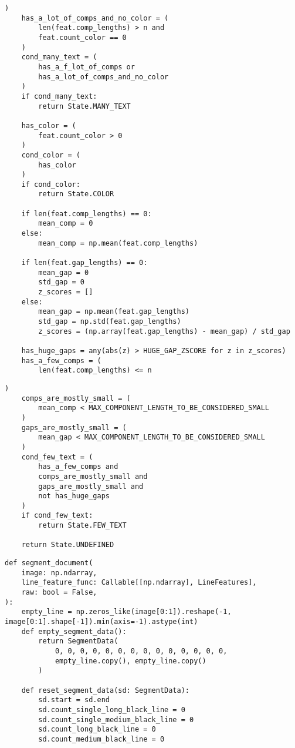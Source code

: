 \begin{lstlisting}[caption={Функция классификации строки (часть 2)}, label={lst:}]
    )
    has_a_lot_of_comps_and_no_color = (
        len(feat.comp_lengths) > n and
        feat.count_color == 0
    )
    cond_many_text = (
        has_a_f_lot_of_comps or
        has_a_lot_of_comps_and_no_color
    )
    if cond_many_text:
        return State.MANY_TEXT

    has_color = (
        feat.count_color > 0
    )
    cond_color = (
        has_color
    )
    if cond_color:
        return State.COLOR

    if len(feat.comp_lengths) == 0:
        mean_comp = 0
    else:
        mean_comp = np.mean(feat.comp_lengths)

    if len(feat.gap_lengths) == 0:
        mean_gap = 0
        std_gap = 0
        z_scores = []
    else:
        mean_gap = np.mean(feat.gap_lengths)
        std_gap = np.std(feat.gap_lengths)
        z_scores = (np.array(feat.gap_lengths) - mean_gap) / std_gap

    has_huge_gaps = any(abs(z) > HUGE_GAP_ZSCORE for z in z_scores)
    has_a_few_comps = (
        len(feat.comp_lengths) <= n
\end{lstlisting}

\begin{lstlisting}[caption={Функция классификации строки (часть 3)}, label={lst:}]
    )
    comps_are_mostly_small = (
        mean_comp < MAX_COMPONENT_LENGTH_TO_BE_CONSIDERED_SMALL
    )
    gaps_are_mostly_small = (
        mean_gap < MAX_COMPONENT_LENGTH_TO_BE_CONSIDERED_SMALL
    )
    cond_few_text = (
        has_a_few_comps and
        comps_are_mostly_small and
        gaps_are_mostly_small and
        not has_huge_gaps
    )
    if cond_few_text:
        return State.FEW_TEXT

    return State.UNDEFINED
\end{lstlisting}

\begin{lstlisting}[caption={Функция для создания первичной или уточненной разметки (часть 1)}, label={lst:sd}]
def segment_document(
    image: np.ndarray,
    line_feature_func: Callable[[np.ndarray], LineFeatures],
    raw: bool = False,
):
    empty_line = np.zeros_like(image[0:1]).reshape(-1, image[0:1].shape[-1]).min(axis=-1).astype(int)
    def empty_segment_data():
        return SegmentData(
            0, 0, 0, 0, 0, 0, 0, 0, 0, 0, 0, 0, 0, 0,
            empty_line.copy(), empty_line.copy()
        )

    def reset_segment_data(sd: SegmentData):
        sd.start = sd.end
        sd.count_single_long_black_line = 0
        sd.count_single_medium_black_line = 0
        sd.count_long_black_line = 0
        sd.count_medium_black_line = 0
\end{lstlisting}


